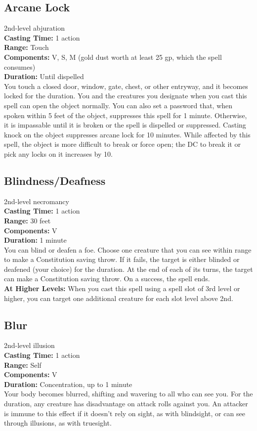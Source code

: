 \documentclass[11pt, A4paper, english]{article}
\begin{document}
		\subsection{Arcane Lock}
2nd-level abjuration \\
\textbf{Casting Time:} 1 action \\
\textbf{Range:} Touch \\
\textbf{Components:} V, S, M (gold dust worth at least 25 gp, which the spell consumes) \\
\textbf{Duration:} Until dispelled \\
You touch a closed door, window, gate, chest, or other entryway, and it becomes locked for the duration. You and the creatures you designate when you cast this spell can open the object normally. You can also set a password that, when spoken within 5 feet of the object, suppresses this spell for 1 minute. Otherwise, it is impassable until it is broken or the spell is dispelled or suppressed. Casting knock on the object suppresses arcane lock for 10 minutes. While affected by this spell, the object is more difficult to break or force open; the DC to break it or pick any locks on it increases by 10.

		\subsection{Blindness/Deafness}
2nd-level necromancy \\
\textbf{Casting Time:} 1 action \\
\textbf{Range:} 30 feet \\
\textbf{Components:} V \\
\textbf{Duration:} 1 minute \\
You can blind or deafen a foe. Choose one creature that you can see within range to make a Constitution saving throw. If it fails, the target is either blinded or deafened (your choice) for the duration. At the end of each of its turns, the target can make a Constitution saving throw. On a success, the spell ends. \\
\textbf{At Higher Levels:} When you cast this spell using a spell slot of 3rd level or higher, you can target one additional creature for each slot level above 2nd.

		\subsection{Blur}
2nd-level illusion \\
\textbf{Casting Time:} 1 action \\
\textbf{Range:} Self \\
\textbf{Components:} V \\
\textbf{Duration:} Concentration, up to 1 minute \\
Your body becomes blurred, shifting and wavering to all who can see you. For the duration, any creature has disadvantage on attack rolls against you. An attacker is immune to this effect if it doesn’t rely on sight, as with blindsight, or can see through illusions, as with truesight.
\end{document}
